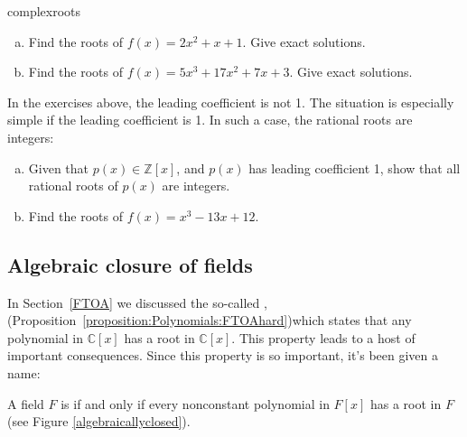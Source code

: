 \begin{exercise}{complexroots}
\begin {enumerate}[(a)]
\item
Find the roots of $f(x)=2x^2+x+1$. Give exact solutions.
\item
Find the roots of $f(x)=5x^3+17x^2+7x+3$. Give exact solutions. 
\end{enumerate}
\end{exercise}
 
In the exercises above, the leading coefficient is not 1. The situation is especially simple if the leading coefficient is 1. In such a case, the rational  roots are integers:

\begin{exercise}{}
\begin{enumerate}[(a)]
\item
Given that $p(x)  \in \mathbb{Z}[x]$, and $p(x)$ has leading coefficient 1, show that all rational roots of $p(x)$ are integers.
\item
Find the roots of $f(x)=x^3-13x+12$.
\end{enumerate}
\end{exercise}


\subsection{Algebraic closure of fields}

In Section~\ref{FTOA} we discussed the so-called , (Proposition~\ref{proposition:Polynomials:FTOAhard})which states that any polynomial in $\mathbb{C}[x]$ has a root in $\mathbb{C}[x]$. This property leads to a host of important consequences.  Since this property is so important, it's been given a name:

\begin{defn}\label{def:algclosed}  
A field $F$ is  if and only if every nonconstant polynomial in $F[x]$ has a root in $F$ (see Figure \ref{algebraicallyclosed}).
\end{defn}

